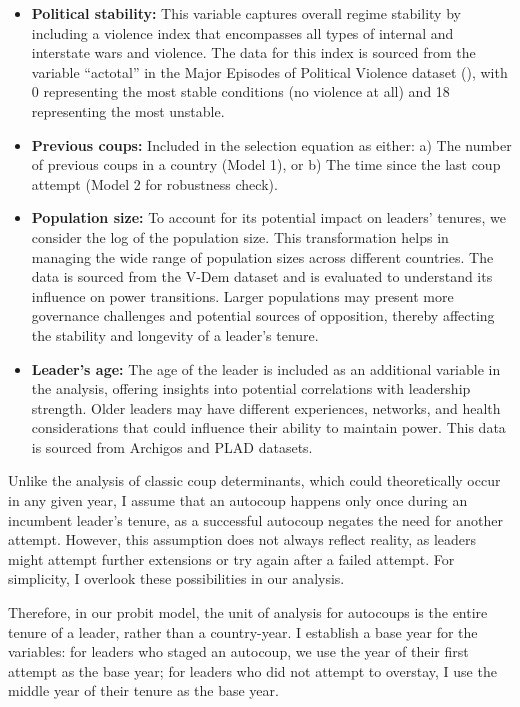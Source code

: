\documentclass[
  12pt,
]{article}
\begin{document}
\begin{itemize}
\item
  \textbf{Political stability:} This variable captures overall regime
  stability by including a violence index that encompasses all types of
  internal and interstate wars and violence. The data for this index is
  sourced from the variable ``actotal'' in the Major Episodes of
  Political Violence dataset
  (), with 0
  representing the most stable conditions (no violence at all) and 18
  representing the most unstable.
\item
  \textbf{Previous coups:} Included in the selection equation as either:
  a) The number of previous coups in a country (Model 1), or b) The time
  since the last coup attempt (Model 2 for robustness check).
\item
  \textbf{Population size:} To account for its potential impact on
  leaders' tenures, we consider the log of the population size. This
  transformation helps in managing the wide range of population sizes
  across different countries. The data is sourced from the V-Dem dataset
  and is evaluated to understand its influence on power transitions.
  Larger populations may present more governance challenges and
  potential sources of opposition, thereby affecting the stability and
  longevity of a leader's tenure.
\item
  \textbf{Leader's age:} The age of the leader is included as an
  additional variable in the analysis, offering insights into potential
  correlations with leadership strength. Older leaders may have
  different experiences, networks, and health considerations that could
  influence their ability to maintain power. This data is sourced from
  Archigos and PLAD datasets.
\end{itemize}

Unlike the analysis of classic coup determinants, which could
theoretically occur in any given year, I assume that an autocoup happens
only once during an incumbent leader's tenure, as a successful autocoup
negates the need for another attempt. However, this assumption does not
always reflect reality, as leaders might attempt further extensions or
try again after a failed attempt. For simplicity, I overlook these
possibilities in our analysis.

Therefore, in our probit model, the unit of analysis for autocoups is
the entire tenure of a leader, rather than a country-year. I establish a
base year for the variables: for leaders who staged an autocoup, we use
the year of their first attempt as the base year; for leaders who did
not attempt to overstay, I use the middle year of their tenure as the
base year.
\end{document}
